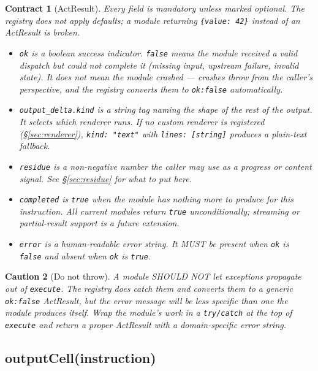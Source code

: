 \documentclass[11pt,a4paper]{article}
\theoremstyle{contract}
\newtheorem{contract}{Contract}[section]
\newtheorem{caution}[contract]{Caution}
\begin{document}
\begin{contract}[ActResult]
\label{contract:actresult}
Every field is mandatory unless marked optional. The registry does not
apply defaults; a module returning \texttt{\{value: 42\}} instead of an
ActResult is broken.

\begin{itemize}[leftmargin=1.4em,itemsep=1pt]
\item \texttt{ok} is a boolean success indicator. \texttt{false} means
the module received a valid dispatch but could not complete it (missing
input, upstream failure, invalid state). It does not mean the module
crashed --- crashes throw from the caller's perspective, and the
registry converts them to \texttt{ok:false} automatically.
\item \texttt{output\_delta.kind} is a string tag naming the shape of
the rest of the output. It selects which renderer runs. If no custom
renderer is registered (\S\ref{sec:renderer}), \texttt{kind: "text"}
with \texttt{lines: [string]} produces a plain-text fallback.
\item \texttt{residue} is a non-negative number the caller may use as a
progress or content signal. See \S\ref{sec:residue} for what to put
here.
\item \texttt{completed} is \texttt{true} when the module has nothing
more to produce for this instruction. All current modules return
\texttt{true} unconditionally; streaming or partial-result support is a
future extension.
\item \texttt{error} is a human-readable error string. It MUST be
present when \texttt{ok} is \texttt{false} and absent when \texttt{ok}
is \texttt{true}.
\end{itemize}
\end{contract}

\begin{caution}[Do not throw]
\label{caution:throw}
A module SHOULD NOT let exceptions propagate out of \texttt{execute}.
The registry does catch them and converts them to a generic
\texttt{ok:false} ActResult, but the error message will be less specific
than one the module produces itself. Wrap the module's work in a
\texttt{try/catch} at the top of \texttt{execute} and return a proper
ActResult with a domain-specific error string.
\end{caution}

\subsection{outputCell(instruction)}
\end{document}
